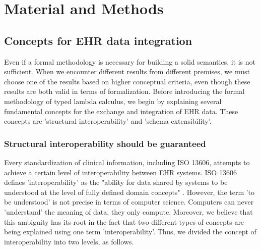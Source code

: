 \documentclass[preprint,3p,onecolumn,times,review]{article}
\begin{document}
\section{Material and Methods}


\subsection{Concepts for EHR data integration\label{sec:higher_concepts}}

Even if a formal methodology is necessary for building a solid semantics, it is not sufficient.
When we encounter different results from different premises, we must choose one of the results based on higher conceptual criteria, even though these results are both valid in terms of formalization.
Before introducing the formal methodology of typed lambda calculus, we begin by explaining several fundamental concepts for the exchange and integration of EHR data.
These concepts are 'structural interoperability' and 'schema extensibility'.


\subsubsection{Structural interoperability should be guaranteed}


Every standardization of clinical information, including ISO 13606, attempts to achieve a certain level of interoperability between EHR systems.
ISO 13606 defines 'interoperability' as the "ability for data shared by systems to be understood at the level of fully defined domain concepts" \cite[p.5]{iso08:13606_healt_elect_part1}.
However, the term 'to be understood' is not precise in terms of computer science. Computers can never 'understand' the meaning of data, they only compute.
Moreover, we believe that this ambiguity has its root in the fact that two different types of concepts are being explained using one term 'interoperability'.
Thus, we divided the concept of interoperability into two levels, as follows.
\end{document}
